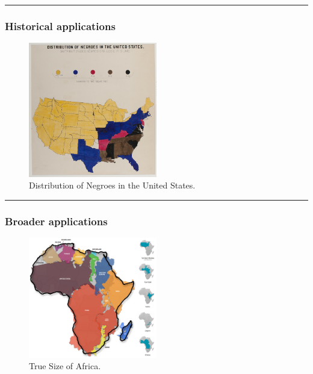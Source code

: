 \documentclass[
  letterpaper,
  DIV=11,
  numbers=noendperiod]{scrartcl}
\begin{document}
\begin{center}\rule{0.5\linewidth}{0.5pt}\end{center}

\hypertarget{historical-applications}{%
\subsubsection{Historical applications}\label{historical-applications}}

\begin{figure}

{\centering \includegraphics[width=0.5\textwidth,height=\textheight]{w1d2e.jpg}

}

\caption{Distribution of Negroes in the United States.}

\end{figure}

\begin{center}\rule{0.5\linewidth}{0.5pt}\end{center}

\hypertarget{broader-applications}{%
\subsubsection{Broader applications}\label{broader-applications}}

\begin{figure}

{\centering \includegraphics[width=0.5\textwidth,height=\textheight]{true-size-of-africa.jpg}

}

\caption{True Size of Africa.}

\end{figure}
\end{document}
